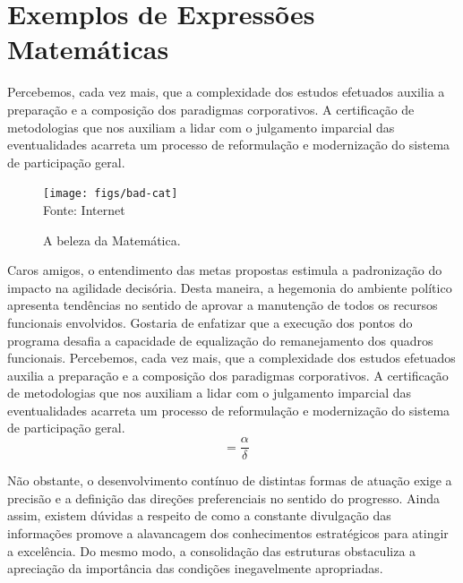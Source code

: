 \documentclass[fleqn]{icat-ufal}
\DeclareMathOperator{\angulo}{\hat{a}ngulo}
\begin{document}
\chapter{Exemplos de Expressões Matemáticas}
\label{cap:exemplos_de_expressoes_matematicas}

Percebemos, cada vez mais, que a complexidade dos estudos efetuados
auxilia a preparação e a composição dos paradigmas corporativos. A certificação
de metodologias que nos auxiliam a lidar com o julgamento imparcial das
eventualidades acarreta um processo de reformulação e modernização do sistema de
participação geral. 

\begin{figure}
    \centering
    \caption{A beleza da Matemática.}
    \label{fig:latexpet}
    \texttt{[image: figs/bad-cat]}
    \\ Fonte: Internet
\end{figure}

Caros amigos, o entendimento das metas propostas estimula a padronização do
impacto na agilidade decisória. Desta maneira, a hegemonia do ambiente político
apresenta tendências no sentido de aprovar a manutenção de todos os recursos
funcionais envolvidos. Gostaria de enfatizar que a execução dos pontos do
programa desafia a capacidade de equalização do remanejamento dos quadros
funcionais. Percebemos, cada vez mais, que a complexidade dos estudos efetuados
auxilia a preparação e a composição dos paradigmas corporativos. A certificação
de metodologias que nos auxiliam a lidar com o julgamento imparcial das
eventualidades acarreta um processo de reformulação e modernização do sistema de
participação geral. 
\[ \angulo = \frac{\alpha}{\delta} \]

Não obstante, o desenvolvimento contínuo de distintas formas de atuação exige a
precisão e a definição das direções preferenciais no sentido do progresso. Ainda
assim, existem dúvidas a respeito de como a constante divulgação das informações
promove a alavancagem dos conhecimentos estratégicos para atingir a excelência.
Do mesmo modo, a consolidação das estruturas obstaculiza a apreciação da
importância das condições inegavelmente apropriadas. 

\end{document}
